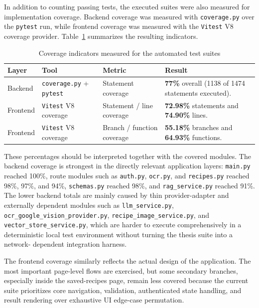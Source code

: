 In addition to counting passing tests, the executed suites were also
measured for implementation coverage. Backend coverage was measured with
\texttt{coverage.py} over the \texttt{pytest} run, while frontend
coverage was measured with the \texttt{Vitest} V8 coverage provider.
Table~\ref{tab:coverage-summary} summarizes the resulting indicators.

\begin{table}[H]
	\centering
	\small
	\renewcommand{\arraystretch}{1.2}
	\begin{tabularx}{\textwidth}{|p{2.3cm}|p{2.4cm}|p{2.5cm}|>{\raggedright\arraybackslash}X|}
		\hline
		\textbf{Layer} & \textbf{Tool} & \textbf{Metric} & \textbf{Result} \\
		\hline
		Backend & \texttt{coverage.py} + \texttt{pytest} & Statement coverage & \textbf{77\%} overall (1138 of 1474 statements executed). \\
		\hline
		Frontend & \texttt{Vitest} V8 coverage & Statement / line coverage & \textbf{72.98\%} statements and \textbf{74.90\%} lines. \\
		\hline
		Frontend & \texttt{Vitest} V8 coverage & Branch / function coverage & \textbf{55.18\%} branches and \textbf{64.93\%} functions. \\
		\hline
		\end{tabularx}
	\caption{Coverage indicators measured for the automated test suites}
	\label{tab:coverage-summary}
\end{table}

These percentages should be interpreted together with the covered
modules. The backend coverage is strongest in the directly relevant
application layers: \texttt{main.py} reached 100\%, route modules such
as \texttt{auth.py}, \texttt{ocr.py}, and \texttt{recipes.py} reached
98\%, 97\%, and 94\%, \texttt{schemas.py} reached 98\%, and
\texttt{rag\_service.py} reached 91\%. The lower backend totals are
mainly caused by thin provider-adapter and externally dependent modules
such as \texttt{llm\_service.py}, \texttt{ocr\_google\_vision\_provider.py},
\texttt{recipe\_image\_service.py}, and \texttt{vector\_store\_service.py},
which are harder to execute comprehensively in a deterministic local
test environment without turning the thesis suite into a network-
dependent integration harness.

The frontend coverage similarly reflects the actual design of the
application. The most important page-level flows are exercised, but some
secondary branches, especially inside the saved-recipes page, remain
less covered because the current suite prioritizes core navigation,
validation, authenticated state handling, and result rendering over
exhaustive UI edge-case permutation.

